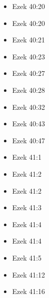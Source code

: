\documentclass[14pt]{book}
\begin{document}
\begin{multicols}{2}
\begin{itemize}
														\item Ezek 40:20
														
														\item Ezek 40:20
														
														\item Ezek 40:21
														
														\item Ezek 40:23
														
														\item Ezek 40:27
														
														\item Ezek 40:28
														
														\item Ezek 40:32
														
														\item Ezek 40:43
														
														\item Ezek 40:47
														
														\item Ezek 41:1
														
														\item Ezek 41:2
														
														\item Ezek 41:2
														
														\item Ezek 41:3
														
														\item Ezek 41:4
														
														\item Ezek 41:4
														
														\item Ezek 41:5
														
														\item Ezek 41:12
														
														\item Ezek 41:16
														

\end{itemize}
\end{multicols}
\end{document}
